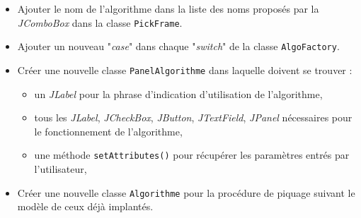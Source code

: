 \begin{itemize}
\item Ajouter le nom de l'algorithme dans la liste des noms proposés par la \emph{JComboBox} dans la classe \texttt{PickFrame}.
\item Ajouter un nouveau "\textit{case}" dans chaque "\textit{switch}" de la classe \texttt{AlgoFactory}.
\item Créer une nouvelle classe \texttt{PanelAlgorithme} dans laquelle doivent se trouver :
	\begin{itemize}
	\item un \emph{JLabel} pour la phrase d'indication d'utilisation de l'algorithme,
	\item tous les \emph{JLabel}, \emph{JCheckBox}, \emph{JButton}, \emph{JTextField}, \emph{JPanel} nécessaires pour le fonctionnement de l'algorithme,
	\item une méthode \texttt{setAttributes()} pour récupérer les paramètres entrés par l'utilisateur,
	\end{itemize}
\item Créer une nouvelle classe \texttt{Algorithme} pour la procédure de piquage suivant le modèle de ceux déjà implantés. 
\end{itemize}




















